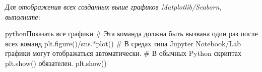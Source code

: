 \begin{center}
\textit{Для отображения всех созданных выше графиков Matplotlib/Seaborn, выполните:}
\begin{codebox}{python}{Показать все графики}
# Эта команда должна быть вызвана один раз после всех команд plt.figure()/sns.*plot()
# В средах типа Jupyter Notebook/Lab графики могут отображаться автоматически.
# В обычных Python скриптах plt.show() обязателен.
plt.show()
\end{codebox}
\end{center}


